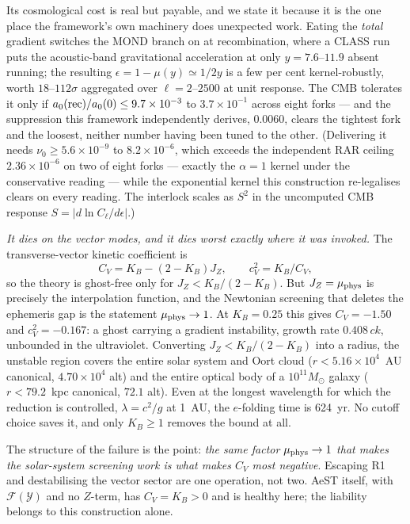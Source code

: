 \documentclass[aps,prd,twocolumn,10pt,nofootinbib,superscriptaddress]{revtex4-2}
\newcommand{\FF}{\mathcal{F}}
\newcommand{\YY}{\mathcal{Y}}
\begin{document}
Its cosmological cost is real but payable, and we state it because it is the one place the
framework's own machinery does unexpected work. Eating the \emph{total} gradient switches the MOND
branch on at recombination, where a CLASS run puts the acoustic-band gravitational acceleration at
only $y=7.6$--$11.9$ absent running; the resulting $\epsilon=1-\mu(y)\simeq1/2y$ is a few per cent
kernel-robustly, worth $18$--$112\sigma$ aggregated over $\ell=2$--$2500$ at unit response. The CMB
tolerates it only if $a_0({\rm rec})/a_0(0)\le9.7\times10^{-3}$ to $3.7\times10^{-1}$ across eight
forks --- and the suppression this framework independently derives, $0.0060$, clears the tightest
fork and the loosest, neither number having been tuned to the other. (Delivering it needs
$\nu_0\ge5.6\times10^{-9}$ to $8.2\times10^{-6}$, which exceeds the independent RAR ceiling
$2.36\times10^{-6}$ on two of eight forks --- exactly the $\alpha=1$ kernel under the conservative
reading --- while the exponential kernel this construction re-legalises clears on every reading.
The interlock scales as $S^2$ in the uncomputed CMB response $S=|d\ln C_\ell/d\epsilon|$.)

\emph{It dies on the vector modes, and it dies worst exactly where it was invoked.} The
transverse-vector kinetic coefficient is
\begin{equation}
C_V=K_B-(2-K_B)J_Z,\qquad c_V^2=K_B/C_V,
\label{eq:CV}
\end{equation}
so the theory is ghost-free only for $J_Z<K_B/(2-K_B)$. But $J_Z=\mu_{\rm phys}$ is precisely the
interpolation function, and the Newtonian screening that deletes the ephemeris gap is the
statement $\mu_{\rm phys}\to1$. At $K_B=0.25$ this gives $C_V=-1.50$ and $c_V^2=-0.167$: a ghost
carrying a gradient instability, growth rate $0.408\,ck$, unbounded in the ultraviolet. Converting
$J_Z<K_B/(2-K_B)$ into a radius, the unstable region covers the entire solar system and Oort cloud
($r<5.16\times10^{4}$~AU canonical, $4.70\times10^4$ alt) and the entire optical body of a
$10^{11}M_\odot$ galaxy ($r<79.2$~kpc canonical, $72.1$ alt). Even at the longest wavelength for
which the reduction is controlled, $\lambda=c^2/g$ at 1~AU, the $e$-folding time is 624~yr. No
cutoff choice saves it, and only $K_B\ge1$ removes the bound at all.

The structure of the failure is the point: \emph{the same factor $\mu_{\rm phys}\to1$ that makes
the solar-system screening work is what makes $C_V$ most negative}. Escaping R1 and destabilising
the vector sector are one operation, not two. AeST itself, with $\FF(\YY)$ and no $Z$-term, has
$C_V=K_B>0$ and is healthy here; the liability belongs to this construction alone.
\end{document}
